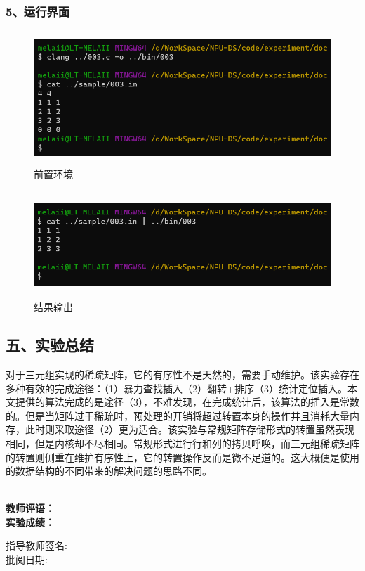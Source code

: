 \documentclass[UTF8, a4paper]{ctexart}
\begin{document}
\subsubsection*{5、运行界面}
\begin{figure}[H]
	\begin{minipage}[t]{\linewidth}
		\centering
		\includegraphics[width=125mm,height=50mm]{./assets/DS03-2}
		\caption{前置环境}
	\end{minipage}
\end{figure}
\begin{figure}[H]
	\begin{minipage}[t]{\linewidth}
		\centering
		\includegraphics[width=125mm,height=40mm]{./assets/DS03-3}
		\caption{结果输出}
	\end{minipage}
\end{figure}

\subsection*{五、实验总结}
对于三元组实现的稀疏矩阵，它的有序性不是天然的，需要手动维护。该实验存在多种有效的完成途径：（1）暴力查找插入（2）翻转+排序（3）统计定位插入。本文提供的算法完成的是途径（3），不难发现，在完成统计后，该算法的插入是常数的。但是当矩阵过于稀疏时，预处理的开销将超过转置本身的操作并且消耗大量内存，此时则采取途径（2）更为适合。该实验与常规矩阵存储形式的转置虽然表现相同，但是内核却不尽相同。常规形式进行行和列的拷贝呼唤，而三元组稀疏矩阵的转置则侧重在维护有序性上，它的转置操作反而是微不足道的。这大概便是使用的数据结构的不同带来的解决问题的思路不同。

~\\
\textbf{教师评语：}
~\\
\textbf{实验成绩：}

\begin{flushright}
\mbox{指导教师签名:\qquad\qquad} \\
\mbox{批阅日期:\qquad\qquad}
\end{flushright}
\end{document}
